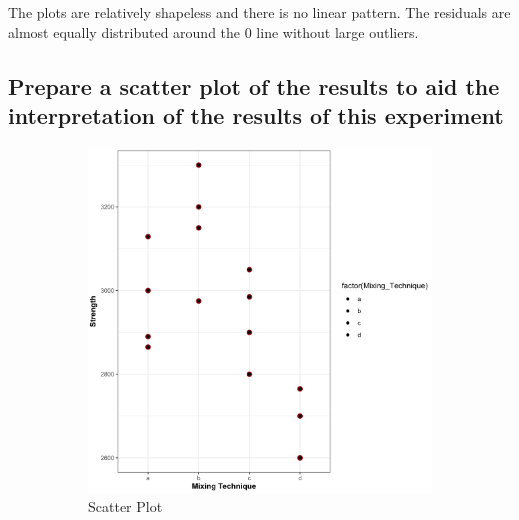 \documentclass[11pt]{article}
\begin{document}
The plots are relatively shapeless and there is no linear pattern. The residuals are almost equally distributed around the 0 line without large outliers.


\subsection{Prepare a scatter plot of the results to aid the interpretation of the results of this experiment}

\begin{figure}[H]
    \centering
    \begin{subfigure}{0.45\textwidth}
        \includegraphics[width=\textwidth]{../pictures/hw2_q1_scatter.png}
        \caption{Scatter Plot}
    \end{subfigure}
    \begin{subfigure}{0.45\textwidth}

\end{subfigure}
\end{figure}
\end{document}
